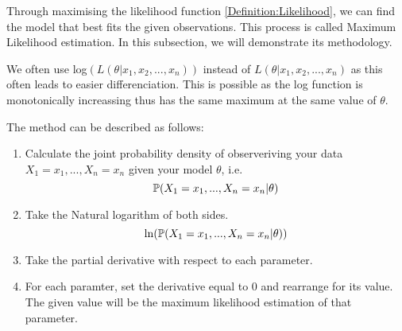     Through maximising the likelihood function \ref{Definition:Likelihood}, we can find the model that best fits the given observations. This process is called Maximum Likelihood estimation. In this subsection, we will demonstrate its methodology.

    We often use log$(L(\theta|x_1, x_2,...,x_n))$ instead of $L(\theta|x_1, x_2,...,x_n)$ as this often leads to easier differenciation. This is possible as the log function is monotonically increassing thus has the same maximum at the same value of $\theta$.

    The method can be described as follows:
    \begin{enumerate}[i]
        \label{Model_Selection:Maximum_Liklihood_Estimators:MLE:Method}
        \item Calculate the joint probability density of observeriving your data $X_1 = x_1,...,X_n=x_n$ given your model $\theta$, i.e.
        \begin{equation}
            \mathbb{P}(X_1 = x_1,...,X_n=x_n|\theta)
        \end{equation}
        \item Take the Natural logarithm of both sides. 
        \begin{equation}
            \ln(\mathbb{P}(X_1 = x_1,...,X_n=x_n|\theta))
        \end{equation}
        \item Take the partial derivative with respect to each parameter.
        \item For each paramter, set the derivative equal to 0 and rearrange for its value. The given value will be the maximum likelihood estimation of that parameter.
    \end{enumerate}

